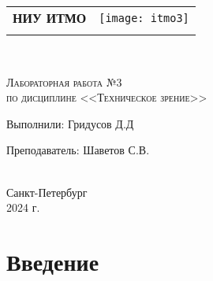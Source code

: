 


\begin{titlepage}
    \newpage
    \begin{center}
    \begin{tabular}{cc}
         \parbox{12cm}{\centering \textbf{НИУ ИТМО}} & \parbox{4cm}{\texttt{[image: itmo3]}}\\
         \\
         \hline
         \hline
    \end{tabular}
    \end{center}
    
    \begin{center}
    \\ 
    \end{center}
    
    \vspace{1cm}
    
    \begin{center}
        \textsc{Лабораторная работа №3 \\ по дисциплине <<Техническое зрение>>}
    \end{center}
    
    \vspace{8em}
    
    \noindent Выполнили:  \hfill Гридусов Д.Д
    
    \vspace{20pt}
    
    \noindent Преподаватель: \hfill Шаветов С.В. \\
    \\
    \vfill
    
    \begin{center}
    Санкт-Петербург \\2024 г.
    \end{center}
    
    \end{titlepage}
    
    \tableofcontents
    \newpage
    \section{Введение}
